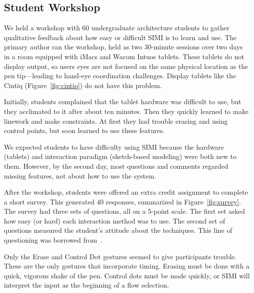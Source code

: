 \documentclass{article}
\begin{document}
\subsection{Student Workshop}

We held a workshop with 60 undergraduate architecture students to
gather qualitative feedback about how easy or difficult SIMI is to
learn and use. The primary author ran the workshop, held as two
30-minute sessions over two days in a room equipped with iMacs and
Wacom Intuos tablets. These tablets do not display output, so users
eyes are not focused on the same physical location as the pen
tip---leading to hand-eye coordination challenges. Display tablets
like the Cintiq (Figure~\ref{fig:cintiq}) do not have this problem.

Initially, students complained that the tablet hardware was difficult
to use, but they acclimated to it after about ten minutes. Then they
quickly learned to make linework and make constraints. At first they
had trouble erasing and using control points, but soon learned to use
these features.


We expected students to have difficulty using SIMI because the
hardware (tablets) and interaction paradigm (sketch-based modeling)
were both new to them. However, by the second day, most questions and
comments regarded missing features, not about how to use the system.

After the workshop, students were offered an extra credit assignment
to complete a short survey. This generated 40 responses, summarized in
Figure~\ref{fig:survey}. The survey had three sets of questions, all
on a 5-point scale. The first set asked how easy (or hard) each
interaction method was to use. The second set of questions measured
the student's attitude about the techniques. This line of questioning
was borrowed from~\cite{bae-everybody}.

Only the Erase and Control Dot gestures seemed to give participants
trouble. These are the only gestures that incorporate timing. Erasing
must be done with a quick, vigorous shake of the pen. Control dots
must be made quickly, or SIMI will interpret the input as the
beginning of a flow selection.
\end{document}
